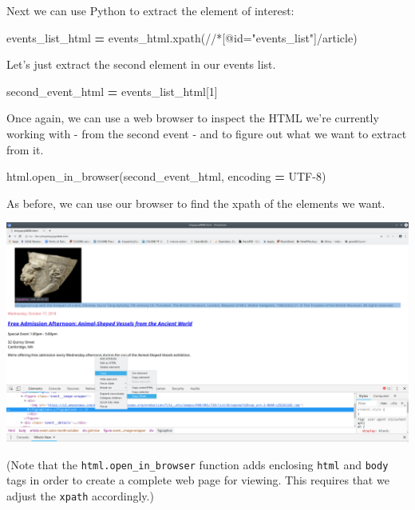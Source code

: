 \documentclass[
]{book}
\newenvironment{Shaded}{\begin{snugshade}}{\end{snugshade}}
\newcommand{\DecValTok}[1]{\textcolor[rgb]{0.00,0.00,0.81}{#1}}
\newcommand{\NormalTok}[1]{#1}
\newcommand{\OperatorTok}[1]{\textcolor[rgb]{0.81,0.36,0.00}{\textbf{#1}}}
\newcommand{\StringTok}[1]{\textcolor[rgb]{0.31,0.60,0.02}{#1}}
\begin{document}
Next we can use Python to extract the element of interest:

\begin{Shaded}
\begin{Highlighting}[]
\NormalTok{events\_list\_html }\OperatorTok{=}\NormalTok{ events\_html.xpath(}\StringTok{\textquotesingle{}//*[@id="events\_list"]/article\textquotesingle{}}\NormalTok{)}
\end{Highlighting}
\end{Shaded}

Let's just extract the second element in our events list.

\begin{Shaded}
\begin{Highlighting}[]
\NormalTok{second\_event\_html }\OperatorTok{=}\NormalTok{ events\_list\_html[}\DecValTok{1}\NormalTok{]}
\end{Highlighting}
\end{Shaded}

Once again, we can use a web browser to inspect the HTML we're currently working with - from the second event - and to figure out what we want to extract from it.

\begin{Shaded}
\begin{Highlighting}[]
\NormalTok{html.open\_in\_browser(second\_event\_html, encoding }\OperatorTok{=} \StringTok{\textquotesingle{}UTF{-}8\textquotesingle{}}\NormalTok{)}
\end{Highlighting}
\end{Shaded}

As before, we can use our browser to find the xpath of the elements we want.

\includegraphics{Python/PythonWebScrape/images/dev_tools_figcaption.png}

(Note that the \texttt{html.open\_in\_browser} function adds enclosing \texttt{html} and \texttt{body} tags in order to create a complete web page for viewing. This requires that we adjust the \texttt{xpath} accordingly.)
\end{document}
